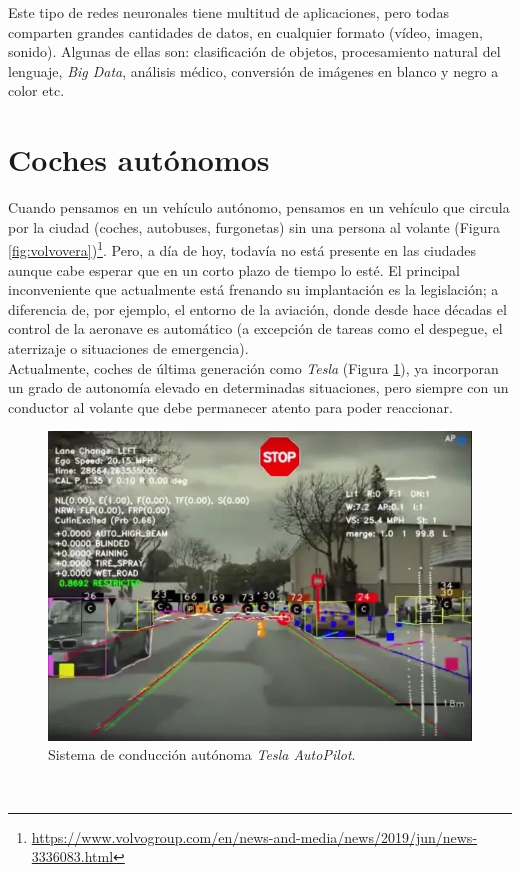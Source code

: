 Este tipo de redes neuronales tiene multitud de aplicaciones, pero todas comparten grandes cantidades de datos, en cualquier formato (vídeo, imagen, sonido). Algunas de ellas son: clasificación de objetos, procesamiento natural del lenguaje, \textit{Big Data}, análisis médico, conversión de imágenes en blanco y negro a color etc.\\

\section{Coches autónomos}
\label{sec:cochesautonomos}
Cuando pensamos en un vehículo autónomo, pensamos en un vehículo que circula por la ciudad (coches, autobuses, furgonetas) sin una persona al volante (Figura \ref{fig:volvovera})\footnote{\url{https://www.volvogroup.com/en/news-and-media/news/2019/jun/news-3336083.html}}. Pero, a día de hoy, todavía no está presente en las ciudades aunque cabe esperar que en un corto plazo de tiempo lo esté. El principal inconveniente que actualmente está frenando su implantación es la legislación; a diferencia de, por ejemplo, el entorno de la aviación, donde desde hace décadas el control de la aeronave es automático (a excepción de tareas como el despegue, el aterrizaje o situaciones de emergencia).\\

Actualmente, coches de última generación como \textit{Tesla} (Figura \ref{fig:teslaobjectdetection}), ya incorporan un grado de autonomía elevado en determinadas situaciones, pero siempre con un conductor al volante que debe permanecer atento para poder reaccionar.\\

\begin{figure} [h!]
	\begin{center}
		\includegraphics[width=12cm]{figs/teslaobjectdetection}
	\end{center}
	\caption{Sistema de conducción autónoma \textit{Tesla AutoPilot}.}
	\label{fig:teslaobjectdetection}
\end{figure}\

